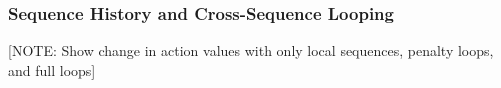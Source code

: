 \documentclass[]{article}
\begin{document}
\subsubsection{Sequence History and Cross-Sequence Looping}

[NOTE: Show change in action values with only local sequences, penalty loops, and full loops]



%
\end{document}
